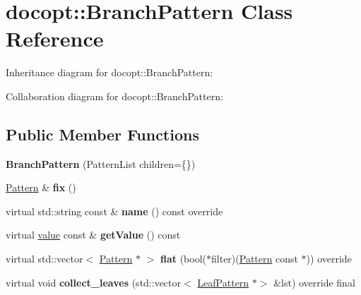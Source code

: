 \hypertarget{classdocopt_1_1BranchPattern}{}\section{docopt\+:\+:Branch\+Pattern Class Reference}
\label{classdocopt_1_1BranchPattern}


Inheritance diagram for docopt\+:\+:Branch\+Pattern\+:


Collaboration diagram for docopt\+:\+:Branch\+Pattern\+:
\subsection*{Public Member Functions}
\begin{DoxyCompactItemize}
\item 
\mbox{\label{classdocopt_1_1BranchPattern_a8a56cbf0c6b730c509cf3922acba2f31}} 
{\bfseries Branch\+Pattern} (Pattern\+List children=\{\})
\item 
\mbox{\label{classdocopt_1_1BranchPattern_ab0c5769d242d5b41c5766ba6d772a34e}} 
\hyperlink{classdocopt_1_1Pattern}{Pattern} \& {\bfseries fix} ()
\item 
\mbox{\label{classdocopt_1_1BranchPattern_abe21ea9bf1f491c64842921bc61d5cdd}} 
virtual std\+::string const  \& {\bfseries name} () const override
\item 
\mbox{\label{classdocopt_1_1BranchPattern_a73fb256384426f7cdad70fcaf13a5195}} 
virtual \hyperlink{structdocopt_1_1value}{value} const  \& {\bfseries get\+Value} () const
\item 
\mbox{\label{classdocopt_1_1BranchPattern_a7927fbc8ea5f3571f6b2e0e941f3b9b4}} 
virtual std\+::vector$<$ \hyperlink{classdocopt_1_1Pattern}{Pattern} $\ast$ $>$ {\bfseries flat} (bool($\ast$filter)(\hyperlink{classdocopt_1_1Pattern}{Pattern} const $\ast$)) override
\item 
\mbox{\label{classdocopt_1_1BranchPattern_a48bfc54d124536d84aca67bee7745c34}} 
virtual void {\bfseries collect\+\_\+leaves} (std\+::vector$<$ \hyperlink{classdocopt_1_1LeafPattern}{Leaf\+Pattern} $\ast$$>$ \&lst) override final
$$
\end{DoxyCompactItemize}
